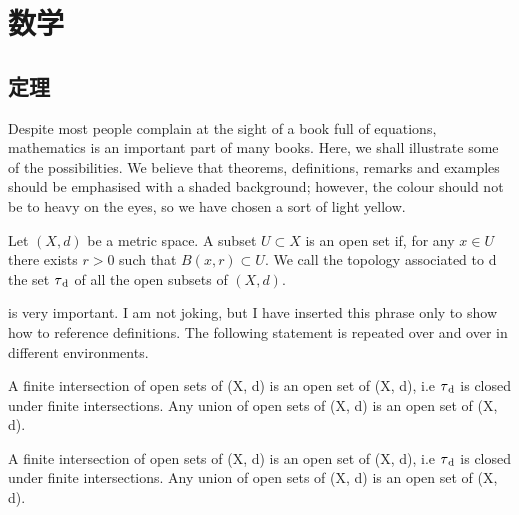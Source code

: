 \setchapterpreamble[u]{\margintoc}
\chapter{数学}

\section{定理}

Despite most people complain at the sight of a book full of equations,
mathematics is an important part of many books. Here, we shall
illustrate some of the possibilities. We believe that theorems,
definitions, remarks and examples should be emphasised with a shaded
background; however, the colour should not be to heavy on the eyes, so
we have chosen a sort of light yellow.

\begin{Definition}
	Let $(X, d)$ be a metric space. A subset $U \subset X$ is an open set
	if, for any $x \in U$ there exists $r > 0$ such that $B(x, r) \subset
		U$. We call the topology associated to d the set $\tau\textsubscript{d}$
	of all the open subsets of $(X, d).$
\end{Definition}

 is very important. I am not joking, but I have inserted
this phrase only to show how to reference definitions. The following
statement is repeated over and over in different environments.

\begin{Theorem}
	A finite intersection of open sets of (X, d) is an open set of (X, d),
	i.e $\tau\textsubscript{d}$ is closed under finite intersections. Any
	union of open sets of (X, d) is an open set of (X, d).
\end{Theorem}

\begin{Proposition}
	A finite intersection of open sets of (X, d) is an open set of (X, d),
	i.e $\tau\textsubscript{d}$ is closed under finite intersections. Any
	union of open sets of (X, d) is an open set of (X, d).
\end{Proposition}


